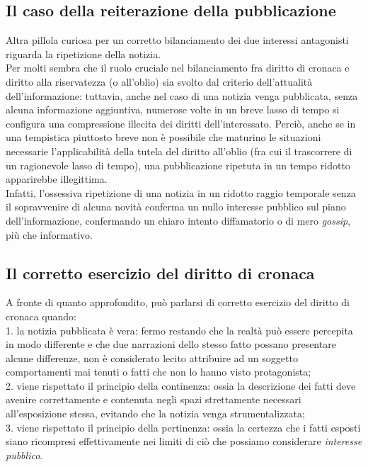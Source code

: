 \subsection{Il caso della reiterazione della pubblicazione}
Altra pillola curiosa per un corretto bilanciamento dei due interessi antagonisti riguarda la ripetizione della notizia.
\\Per molti sembra che il ruolo cruciale nel bilanciamento fra diritto di cronaca e diritto alla riservatezza (o all'oblio) sia svolto dal criterio dell'attualità dell'informazione: tuttavia, anche nel caso di una notizia venga pubblicata, senza alcuna informazione aggiuntiva, numerose volte in un breve lasso di tempo si configura una compressione illecita dei diritti dell'interessato.
Perciò, anche se in una tempistica piuttosto breve non è possibile che maturino le situazioni necessarie l'applicabilità della tutela del diritto all'oblio (fra cui il trascorrere di un ragionevole lasso di tempo), una pubblicazione ripetuta in un tempo ridotto apparirebbe illegittima.
\\Infatti, l'ossessiva ripetizione di una notizia in un ridotto raggio temporale senza il sopravvenire di alcuna novità conferma un nullo interesse pubblico sul piano dell'informazione, confermando un chiaro intento diffamatorio o di mero \textit{gossip}, più che informativo. 

\subsection{Il corretto esercizio del diritto di cronaca}
A fronte di quanto approfondito, può parlarsi di corretto esercizio del diritto di cronaca quando:
\\1. la notizia pubblicata è vera: fermo restando che la realtà può essere percepita in modo differente e che due narrazioni dello stesso fatto possano presentare alcune differenze, non è considerato lecito attribuire ad un soggetto comportamenti mai tenuti o fatti che non lo hanno visto protagonista;
\\2. viene rispettato il principio della continenza: ossia la descrizione dei fatti deve avenire correttamente e contenuta negli spazi strettamente necessari all'esposizione stessa, evitando che la notizia venga strumentalizzata;
\\3. viene rispettato il principio della pertinenza: ossia la certezza che i fatti esposti siano ricompresi effettivamente nei limiti di ciò che possiamo considerare \textit{interesse pubblico}.


